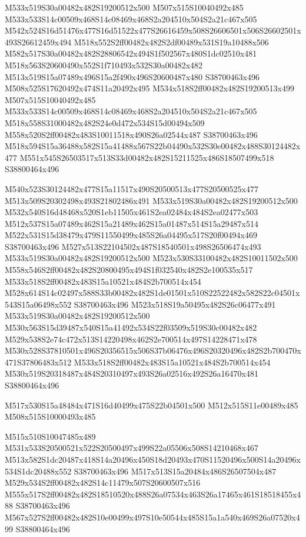 \documentclass{article}
\begin{document}
\begin{multicols}{2}
M533x519S30a00482x482S19200512x500 M507x515S10040492x485 M533x533S14c00509x468S14c08469x468S2a204510x504S2a21c467x505 M542x524S16d51476x477S16d51522x477S26616459x508S26606501x506S26602501x493S26612459x494 M518x552S2ff00482x482S2df00489x531S19a10488x506 M582x517S30a00482x482S28806542x494S1f502567x480S1dc02510x481 M518x563S20600490x552S1f710493x532S30a00482x482 M513x519S15a07489x496S15a2f490x496S20600487x480 S38700463x496 M508x525S17620492x474S11a20492x495 M534x518S2ff00482x482S19200513x499 M507x515S10040492x485 M533x533S14c00509x468S14c08469x468S2a204510x504S2a21c467x505 M518x558S31000482x482S24e0d472x534S15d00494x509 M558x520S2ff00482x483S10011518x490S26a02544x487 S38700463x496 M518x594S15a36488x582S15a41488x567S22b04490x532S30e00482x488S30124482x477 M551x545S26503517x513S33d00482x482S15211525x486S18507499x518 S38800464x496

M540x523S30124482x477S15a11517x490S20500513x477S20500525x477 M513x509S20302498x493S21802486x491 M533x519S30a00482x482S19200512x500 M532x540S16d48468x520S1eb11505x461S2ea02484x484S2ea02477x503 M512x537S15a07489x462S15a21489x462S15a01487x514S15a29487x514 M522x531S15d38479x479S11550499x485S26a04495x517S20f00494x469 S38700463x496 M527x513S22104502x487S18540501x498S26506474x493 M533x519S30a00482x482S19200512x500 M523x530S33100482x482S10011502x500 M558x546S2ff00482x482S20800495x494S1f032540x482S2e100535x517 M533x518S2ff00482x483S15a10521x484S2b700514x454 M528x614S14c02497x588S33b00482x482S1de01501x510S22522482x582S22c04501x543S15a06498x552 S38700463x496 M523x518S19a50495x482S26c06477x491 M533x519S30a00482x482S19200512x500 M530x563S15d39487x540S15a41492x534S22f03509x519S30c00482x482 M529x538S2e74c472x513S14220498x462S2e700514x497S14228471x478 M530x528S37810501x496S20356515x506S37b06476x496S20320496x482S2b700470x471S37806483x512 M533x518S2ff00482x483S15a10521x484S2b700514x454 M530x519S20318487x484S20310497x493S26a02516x492S26a16470x481 S38800464x496

\begin{center}
M517x530S15a48484x471S16d40499x475S22b04501x500 M512x515S11e00489x485 M508x515S10000493x485 
\end{center}


M515x510S10047485x489 M531x533S20500521x522S20500497x499S22a05506x508S14210468x467 M513x582S1dc20487x418S14a20496x450S18d20493x470S11520496x500S14a20496x534S1dc20488x552 S38700463x496 M517x513S15a20484x486S26507504x487 M529x534S2ff00482x482S14c11479x507S20600507x516 M555x517S2ff00482x482S18510520x488S26a07534x463S26a17465x461S18518455x488 S38700463x496 M567x527S2ff00482x482S10e00499x497S10e50544x485S15a1a540x469S26a07520x499 S38800464x496


\end{multicols}
\end{document}
